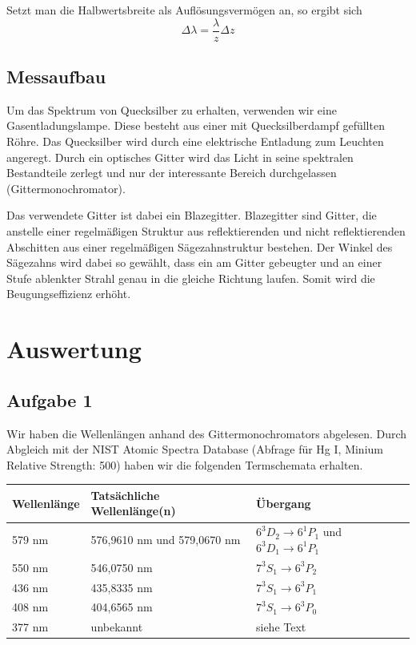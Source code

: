 \documentclass[a4paper,german,12pt,smallheadings]{scrartcl}
\begin{document}
Setzt man die Halbwertsbreite als Auflösungsvermögen an, so ergibt sich
\begin{equation}
  \Delta \lambda = \frac{\lambda}{z} \Delta z
  \label{eq:aufls}
\end{equation}

\subsection{Messaufbau}

Um das Spektrum von Quecksilber zu erhalten, verwenden wir eine Gasentladungslampe.
Diese besteht aus einer mit Quecksilberdampf gefüllten Röhre. Das Quecksilber wird
durch eine elektrische Entladung zum Leuchten angeregt. Durch ein optisches
Gitter wird das Licht in seine spektralen Bestandteile zerlegt und nur der
interessante Bereich durchgelassen (Gittermonochromator).

Das verwendete Gitter ist dabei ein Blazegitter. Blazegitter sind Gitter, die
anstelle einer regelmäßigen Struktur aus reflektierenden und nicht
reflektierenden Abschitten aus einer regelmäßigen Sägezahnstruktur bestehen.
Der Winkel des Sägezahns wird dabei so gewählt, dass ein am Gitter gebeugter
und an einer Stufe ablenkter Strahl genau in die gleiche Richtung laufen. Somit
wird die Beugungseffizienz erhöht.

\section{Auswertung}

\subsection{Aufgabe 1}

Wir haben die Wellenlängen anhand des Gittermonochromators abgelesen. Durch
Abgleich mit der NIST Atomic Spectra Database (Abfrage für Hg I, Minium
Relative Strength: 500) haben wir die folgenden Termschemata erhalten.

\begin{tabular}{l|l|l}
  Wellenlänge & Tatsächliche Wellenlänge(n) & Übergang \\
  \hline
  579 nm & 576{,}9610 nm und 579{,}0670 nm & $6^3D_2 \to 6^1P_1$ und $6^3D_1 \to 6^1P_1$ \\
  550 nm & 546{,}0750 nm                   & $7^3S_1 \to 6^3P_2$ \\
  436 nm & 435{,}8335 nm                   & $7^3S_1 \to 6^3P_1$ \\
  408 nm & 404{,}6565 nm                   & $7^3S_1 \to 6^3P_0$ \\
  377 nm & unbekannt & siehe Text
\end{tabular}
\vspace{22pt}
\end{document}
